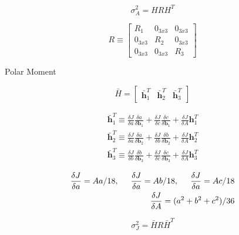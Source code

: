 \documentclass[12pt,a4paper,oneside]{article}
\begin{document}
\begin{equation}
\sigma_A^2 = HRH^T
\end{equation}

\begin{equation}
R \equiv \begin{bmatrix}
R_1 & 0_{3x3} & 0_{3x3} \\
0_{3x3} & R_2 & 0_{3x3} \\
0_{3x3} & 0_{3x3} & R_3
\end{bmatrix}
\end{equation}

Polar Moment

\begin{equation}
\bar{H} = \begin{bmatrix}
\bar{\bm{h}}_1^T & \bar{\bm{h}}_2^T & \bar{\bm{h}}_3^T
\end{bmatrix}
\end{equation}

\begin{subequations}
\begin{align*}
\bar{\bm{h}}_1^T \equiv \frac{\delta J}{\delta a}\frac{\delta a}{\delta\bm{b}_1} + \frac{\delta J}{\delta c}\frac{\delta c}{\delta\bm{b}_1} + \frac{\delta J}{\delta A}\bm{h}_1^T\\
\bar{\bm{h}}_2^T \equiv \frac{\delta J}{\delta a}\frac{\delta a}{\delta\bm{b}_2} + \frac{\delta J}{\delta b}\frac{\delta b}{\delta\bm{b}_2} + \frac{\delta J}{\delta A}\bm{h}_2^T \\
\bar{\bm{h}}_3^T \equiv \frac{\delta J}{\delta b}\frac{\delta b}{\delta\bm{b}_3} + \frac{\delta J}{\delta c}\frac{\delta c}{\delta\bm{b}_3} + \frac{\delta J}{\delta A}\bm{h}_3^T
\end{align*}
\end{subequations}

\begin{subequations}
\begin{align*}
\frac{\delta J}{\delta a} = A a/18, \hspace{0.5cm} \frac{\delta J}{\delta a} = A b/18, \hspace{0.5cm} \frac{\delta J}{\delta a} = A c/18 \\
\frac{\delta J}{\delta A} = (a^2 + b^2 + c^2)/36
\end{align*}
\end{subequations}

\begin{equation}
\sigma_J^2 = \bar{H}R\bar{H}^T
\end{equation}
\end{document}
